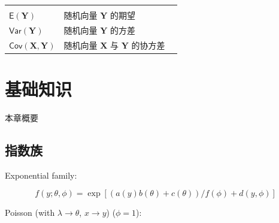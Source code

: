 \documentclass[12pt,a4paper,UTF8,twoside]{book}
\theoremstyle{definition}
\theoremstyle{definition}
\theoremstyle{definition}
\theoremstyle{remark}
\begin{document}
\begin{longtable}[]{@{}llc@{}}
\begin{minipage}[t]{0.14\columnwidth}
\strut
\end{minipage}\tabularnewline
\begin{minipage}[t]{0.15\columnwidth}\raggedright
\(\mathsf{E}(\mathbf{Y})\)\strut
\end{minipage} & \begin{minipage}[t]{0.63\columnwidth}\raggedright
随机向量 \(\mathbf{Y}\) 的期望\strut
\end{minipage} & \begin{minipage}[t]{0.14\columnwidth}\centering
\strut
\end{minipage}\tabularnewline
\begin{minipage}[t]{0.15\columnwidth}\raggedright
\(\mathsf{Var}(\mathbf{Y})\)\strut
\end{minipage} & \begin{minipage}[t]{0.63\columnwidth}\raggedright
随机向量 \(\mathbf{Y}\) 的方差\strut
\end{minipage} & \begin{minipage}[t]{0.14\columnwidth}\centering
\strut
\end{minipage}\tabularnewline
\begin{minipage}[t]{0.15\columnwidth}\raggedright
\(\mathsf{Cov}(\mathbf{X},\mathbf{Y})\)\strut
\end{minipage} & \begin{minipage}[t]{0.63\columnwidth}\raggedright
随机向量 \(\mathbf{X}\) 与 \(\mathbf{Y}\) 的协方差\strut
\end{minipage} & \begin{minipage}[t]{0.14\columnwidth}\centering
\strut
\end{minipage}\tabularnewline
\bottomrule
\end{longtable}

\hypertarget{prepare}{%
\chapter{基础知识}\label{prepare}}

{本章概要}

\hypertarget{sec:exp}{%
\section{指数族}\label{sec:exp}}

Exponential family:

\[
f(y;\theta,\phi) = \exp[(a(y) b(\theta) + c(\theta))/f(\phi) + d(y,\phi)]
\]

Poisson (with \(\lambda \to \theta\), \(x \to y\)) (\(\phi=1\)):
\end{document}
